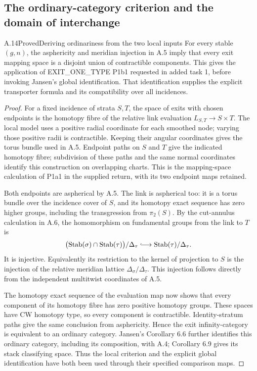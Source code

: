 \subsection{The ordinary-category criterion and the domain of interchange}

\begin{result}{A.14}{Proved}{Deriving ordinariness from the two local inputs}
For every stable $(g,n)$, the asphericity and meridian injection in
A.5 imply that every exit mapping space is a disjoint union of
contractible components. This gives the application of EXIT\_ONE\_TYPE
P1b1 requested in added task 1, before invoking Jansen's global
identification. That identification supplies the explicit transporter
formula and its compatibility over all incidences.
\end{result}
\begin{proof}
For a fixed incidence of strata $S,T$, the space of exits with chosen
endpoints is the homotopy fibre of the relative link evaluation
$L_{S,T}\to S\times T$. The local model uses a positive radial
coordinate for each smoothed node; varying those positive radii is
contractible. Keeping their angular coordinates gives the torus
bundle used in A.5. Endpoint paths on $S$ and $T$ give the indicated
homotopy fibre; subdivision of these paths and the same normal
coordinates identify this construction on overlapping charts. This
is the mapping-space calculation of P1a1 in the supplied return,
with its two endpoint maps retained.

Both endpoints are aspherical by A.5. The link is aspherical too:
it is a torus bundle over the incidence cover of $S$, and its
homotopy exact sequence has zero higher groups, including the
transgression from $\pi_2(S)$. By the cut-annulus calculation in A.6,
the homomorphism on fundamental groups from the link to $T$ is
\[
 \bigl(\Stab(\sigma)\cap\Stab(\tau)\bigr)/\Delta_\tau
       \lhook\joinrel\longrightarrow\Stab(\tau)/\Delta_\tau.
\]
It is injective. Equivalently its restriction to the kernel of
projection to $S$ is the injection of the relative meridian lattice
$\Delta_\sigma/\Delta_\tau$. This injection follows directly from
the independent multitwist coordinates of A.5.

The homotopy exact sequence of the evaluation map now shows that
every component of its homotopy fibre has zero positive homotopy
groups. These spaces have CW homotopy type, so every component is
contractible. Identity-stratum paths give the same conclusion from
asphericity. Hence the exit infinity-category is equivalent to an
ordinary category. Jansen's Corollary 6.6 further identifies this
ordinary category, including its composition, with A.4; Corollary
6.9 gives its stack classifying space. Thus the local criterion and
the explicit global identification have both been used through their
specified comparison maps.
\end{proof}

